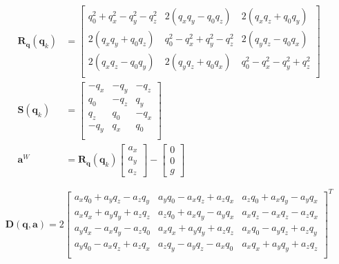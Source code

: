 \begin{align}
	\bm{R_q} \left( \bm{q}_k \right) &=  \begin{bmatrix}
		q_0^2 + q_x^2 - q_y^2 - q_z^2 & 2(q_x q_y - q_0 q_z) & 2(q_x q_z + q_0 q_y) \\
		2(q_x q_y + q_0 q_z) & q_0^2 - q_x^2 + q_y^2 - q_z^2 & 2(q_y q_z - q_0 q_x) \\
		2(q_x q_z - q_0 q_y) & 2(q_y q_z + q_0 q_x) & q_0^2 - q_x^2 - q_y^2 + q_z^2 \\
	\end{bmatrix}
	\\
	\bm{S} \left( \bm{q}_k \right)  &= \begin{bmatrix}
		-q_x & -q_y & -q_z \\
		q_0 & -q_z & q_y \\
		q_z & q_0 & -q_x \\
		-q_y & q_x & q_0 \\
	\end{bmatrix}
	\\
	\bm{a}^W &= \bm{R_q} \left( \bm{q}_k \right) \begin{bmatrix}
		a_x \\ a_y \\ a_z 
	\end{bmatrix} - \begin{bmatrix}
		0 \\ 0 \\ g 
	\end{bmatrix}
	\label{state_end}
\end{align}



\begin{equation}
	\bm{D} \left( \bm{q}, \bm{a}\right)
	=
	2
	\begin{bmatrix}
		a_xq_0 + a_yq_z - a_zq_y & a_yq_0 - a_xq_z + a_zq_x & a_zq_0 + a_xq_y - a_yq_x \\
		a_xq_x + a_yq_y + a_zq_z & a_zq_0 + a_xq_y - a_yq_x & a_xq_z - a_xq_z - a_zq_x \\
		a_yq_x - a_xq_y - a_zq_0 & a_xq_x + a_yq_y + a_zq_z & a_xq_0 - a_yq_z + a_zq_y \\
		a_yq_0 - a_xq_z + a_zq_x & a_zq_y - a_yq_z - a_xq_0 & a_xq_x + a_yq_y + a_zq_z \\
	\end{bmatrix}^T
	\label{state_jacobi_begin}
\end{equation}

